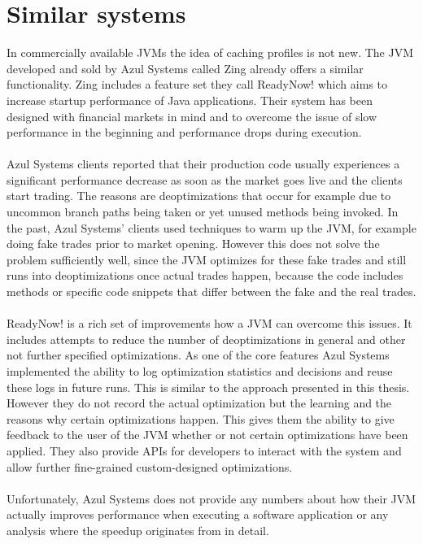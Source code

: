\section{Similar systems}
\label{s:similarsystems}
In commercially available JVMs the idea of caching profiles is not new.
The JVM developed and sold by Azul Systems called Zing \cite{zing} already offers a similar functionality.
Zing includes a feature set they call ReadyNow! \cite{readynow} which aims to increase startup performance of Java applications.
Their system has been designed with financial markets in mind and to overcome the issue of slow performance in the beginning and performance drops during execution.
\\\\
Azul Systems clients reported that their production code usually experiences a significant performance decrease as soon as the market goes live and the clients start trading.
The reasons are deoptimizations that occur for example due to uncommon branch paths being taken or yet unused methods being invoked.
In the past, Azul Systems' clients used techniques to warm up the JVM, for example doing fake trades prior to market opening. However this does not solve the problem sufficiently well, since the JVM optimizes for these fake trades and still runs into deoptimizations once actual trades happen, because the code includes methods or specific code snippets that differ between the fake and the real trades.
\\\\
ReadyNow! is a rich set of improvements how a JVM can overcome this issues. It includes attempts to reduce the number of deoptimizations in general and other not further specified optimizations.
As one of the core features Azul Systems implemented the ability to log optimization statistics and decisions and reuse these logs in future runs. This is similar to the approach presented in this thesis. However they do not record the actual optimization but the learning and the reasons why certain optimizations happen. This gives them the ability to give feedback to the user of the JVM whether or not certain optimizations have been applied. They also provide APIs for developers to interact with the system and allow further fine-grained custom-designed optimizations.
\\\\
Unfortunately, Azul Systems does not provide any numbers about how their JVM actually improves performance when executing a software application or any analysis where the speedup originates from in detail.
